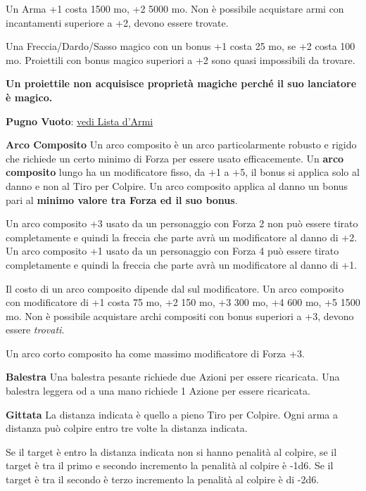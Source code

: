 \begin{multicols}{2}

Un Arma +1 costa 1500 mo, +2 5000 mo. Non è possibile acquistare armi con incantamenti superiore a +2, devono essere trovate.

Una Freccia/Dardo/Sasso magico con un bonus +1 costa 25 mo, se +2 costa 100 mo. Proiettili con bonus magico superiori a +2 sono quasi impossibili da trovare.

\textbf{Un proiettile non acquisisce proprietà magiche perché il suo lanciatore è magico.}

\medskip

\textbf{Pugno Vuoto}: \hyperlink{pugnovuoto}{vedi Lista d'Armi}

\medskip

\textbf{Arco Composito}
Un arco composito è un arco particolarmente robusto e rigido che richiede un certo minimo di Forza per essere usato efficacemente.
Un \textbf{arco composito} lungo ha un modificatore fisso, da +1 a +5, il bonus si applica solo al danno e non al Tiro per Colpire. Un arco composito applica al danno un bonus pari al \textbf{minimo valore tra Forza ed il suo bonus}.

Un arco composito +3 usato da un personaggio con Forza 2 non può essere tirato completamente e quindi la freccia che parte avrà un modificatore al danno di +2.
Un arco composito +1 usato da un personaggio con Forza 4 può essere tirato completamente e quindi la freccia che parte avrà un modificatore al danno di +1.

Il costo di un arco composito dipende dal sul modificatore.
Un arco composito con modificatore di +1 costa 75 mo, +2 150 mo, +3 300 mo, +4 600 mo, +5 1500 mo. Non è possibile acquistare archi compositi con bonus superiori a +3, devono essere \emph{trovati}.

Un arco corto composito ha come massimo modificatore di Forza +3.

\textbf{Balestra}
Una balestra pesante richiede due Azioni per essere ricaricata. Una balestra leggera od a una mano richiede 1 Azione per essere ricaricata.

\textbf{Gittata}
La distanza indicata è quello a pieno Tiro per Colpire. Ogni arma a distanza può colpire entro tre volte la distanza indicata.

Se il target è entro la distanza indicata non si hanno penalità al colpire, se il target è tra il primo e secondo incremento la penalità al colpire è -1d6. Se il target è tra il secondo è terzo incremento la penalità al colpire è di -2d6.


\end{multicols}
